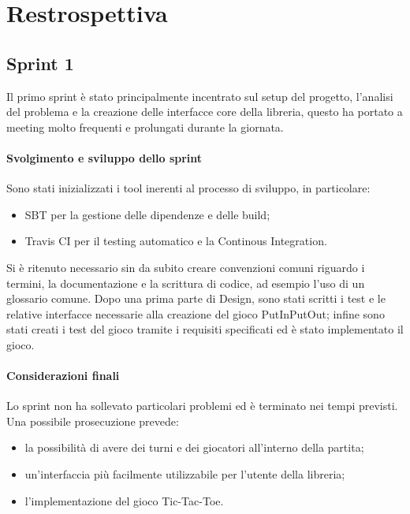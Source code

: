 \section{Restrospettiva}



\subsection{Sprint 1}
Il primo sprint è stato principalmente incentrato sul setup del progetto, l'analisi del problema e la creazione delle interfacce core della libreria, questo ha portato a meeting molto frequenti e prolungati durante la giornata.
\paragraph{Svolgimento e sviluppo dello sprint}
Sono stati inizializzati i tool inerenti al processo di sviluppo, in particolare:
\begin{itemize}
   \item SBT per la gestione delle dipendenze e delle build;
   \item Travis CI per il testing automatico e la Continous Integration.
\end{itemize}
Si è ritenuto necessario sin da subito creare convenzioni comuni riguardo i termini, la documentazione e la scrittura di codice, ad esempio l'uso di un glossario comune.
Dopo una prima parte di Design, sono stati scritti i test e le relative interfacce necessarie alla creazione del gioco PutInPutOut; infine sono stati creati i test del gioco tramite i requisiti specificati ed è stato implementato il gioco.
\paragraph{Considerazioni finali}
Lo sprint non ha sollevato particolari problemi ed è terminato nei tempi previsti.
Una possibile prosecuzione prevede:
\begin{itemize}
  \item la possibilità di avere dei turni e dei giocatori all'interno della partita;
  \item un'interfaccia più facilmente utilizzabile per l'utente della libreria;
  \item l'implementazione del gioco Tic-Tac-Toe.
\end{itemize} 